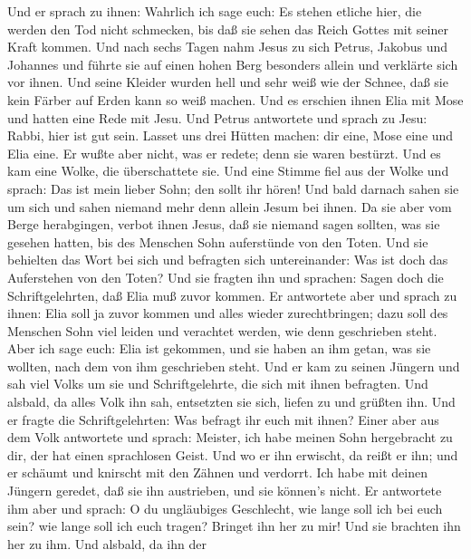 Und er sprach zu ihnen: Wahrlich ich sage euch: Es stehen
etliche hier, die werden den Tod nicht schmecken, bis daß sie sehen das
Reich Gottes mit seiner Kraft kommen.  Und nach sechs Tagen
nahm Jesus zu sich Petrus, Jakobus und Johannes und führte sie auf einen
hohen Berg besonders allein und verklärte sich vor ihnen. 
Und seine Kleider wurden hell und sehr weiß wie der Schnee, daß sie kein
Färber auf Erden kann so weiß machen.  Und es erschien ihnen
Elia mit Mose und hatten eine Rede mit Jesu.  Und Petrus
antwortete und sprach zu Jesu: Rabbi, hier ist gut sein. Lasset uns drei
Hütten machen: dir eine, Mose eine und Elia eine.  Er wußte
aber nicht, was er redete; denn sie waren bestürzt.  Und es
kam eine Wolke, die überschattete sie. Und eine Stimme fiel aus der
Wolke und sprach: Das ist mein lieber Sohn; den sollt ihr hören!
 Und bald darnach sahen sie um sich und sahen niemand mehr
denn allein Jesum bei ihnen.  Da sie aber vom Berge
herabgingen, verbot ihnen Jesus, daß sie niemand sagen sollten, was sie
gesehen hatten, bis des Menschen Sohn auferstünde von den Toten.
 Und sie behielten das Wort bei sich und befragten sich
untereinander: Was ist doch das Auferstehen von den Toten? 
Und sie fragten ihn und sprachen: Sagen doch die Schriftgelehrten, daß
Elia muß zuvor kommen.  Er antwortete aber und sprach zu
ihnen: Elia soll ja zuvor kommen und alles wieder zurechtbringen; dazu
soll des Menschen Sohn viel leiden und verachtet werden, wie denn
geschrieben steht.  Aber ich sage euch: Elia ist gekommen,
und sie haben an ihm getan, was sie wollten, nach dem von ihm
geschrieben steht.  Und er kam zu seinen Jüngern und sah
viel Volks um sie und Schriftgelehrte, die sich mit ihnen befragten.
 Und alsbald, da alles Volk ihn sah, entsetzten sie sich,
liefen zu und grüßten ihn.  Und er fragte die
Schriftgelehrten: Was befragt ihr euch mit ihnen?  Einer
aber aus dem Volk antwortete und sprach: Meister, ich habe meinen Sohn
hergebracht zu dir, der hat einen sprachlosen Geist.  Und
wo er ihn erwischt, da reißt er ihn; und er schäumt und knirscht mit den
Zähnen und verdorrt. Ich habe mit deinen Jüngern geredet, daß sie ihn
austrieben, und sie können's nicht.  Er antwortete ihm aber
und sprach: O du ungläubiges Geschlecht, wie lange soll ich bei euch
sein? wie lange soll ich euch tragen? Bringet ihn her zu mir!
 Und sie brachten ihn her zu ihm. Und alsbald, da ihn der
